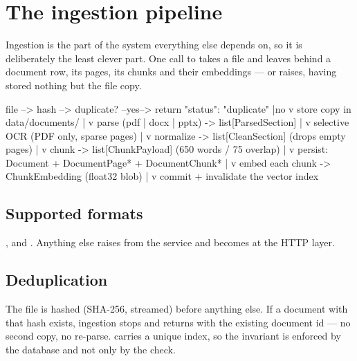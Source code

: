 \chapter{The ingestion pipeline}
\label{ch:ingestion}

Ingestion is the part of the system everything else depends on, so it is
deliberately the least clever part. One call to 
takes a file and leaves behind a document row, its pages, its chunks and their
embeddings --- or raises, having stored nothing but the file copy.

\begin{shellblock}
file --> hash --> duplicate?  --yes--> return {"status": "duplicate"}
                     |no
                     v
                  store copy in data/documents/
                     |
                     v
                  parse  (pdf | docx | pptx)  -> list[ParsedSection]
                     |
                     v
                  selective OCR (PDF only, sparse pages)
                     |
                     v
                  normalize -> list[CleanSection]   (drops empty pages)
                     |
                     v
                  chunk     -> list[ChunkPayload]   (650 words / 75 overlap)
                     |
                     v
                  persist: Document + DocumentPage* + DocumentChunk*
                     |
                     v
                  embed each chunk -> ChunkEmbedding (float32 blob)
                     |
                     v
                  commit + invalidate the vector index
\end{shellblock}

\section{Supported formats}

,  and . Anything else raises
 from the service and becomes 
at the HTTP layer.

\section{Deduplication}

The file is hashed (SHA-256, streamed) before anything else. If a document with
that hash exists, ingestion stops and returns  with
the existing document id --- no second copy, no re-parse. 
carries a unique index, so the invariant is enforced by the database and not
only by the check.

